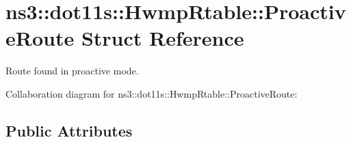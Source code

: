 \hypertarget{structns3_1_1dot11s_1_1HwmpRtable_1_1ProactiveRoute}{}\section{ns3\+:\+:dot11s\+:\+:Hwmp\+Rtable\+:\+:Proactive\+Route Struct Reference}
\label{structns3_1_1dot11s_1_1HwmpRtable_1_1ProactiveRoute}


Route found in proactive mode.  




Collaboration diagram for ns3\+:\+:dot11s\+:\+:Hwmp\+Rtable\+:\+:Proactive\+Route\+:
\subsection*{Public Attributes}
